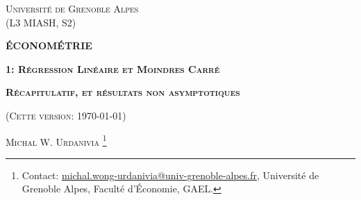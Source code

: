 \documentclass[10pt, reqno]{amsart}
\begin{document}
 
\usetikzlibrary{positioning}
\usetikzlibrary{snakes}
\usetikzlibrary{calc}
\usetikzlibrary{arrows}
\usetikzlibrary{decorations.markings}
\usetikzlibrary{shapes.misc}
\usetikzlibrary{shapes}

%

\begin{titlepage}
\centering
	{\scshape\Large \textsc{Université de Grenoble Alpes\\(L3 MIASH, S2)}\par}
	\vspace{0.5cm}
	{\Large\bfseries \scshape\Large \textsc{ÉCONOMÉTRIE}\par}
	\vspace{0.5cm}
	{\Large\bfseries \textsc{1: Régression Linéaire et Moindres Carré} \par}
    \vspace{0.5cm}   
   {\Large\bfseries \textsc{Récapitulatif, et résultats non asymptotiques} \par}
	\vspace{1cm}
	{(\textsc{Cette version: \today})\par}
	\vspace{1cm}
	{\large \textsc{Michal W. Urdanivia}
	\footnote{Contact:  
	\href{mailto:michal.wong-urdanivia@univ-grenoble-alpes.fr}{michal.wong-urdanivia@univ-grenoble-alpes.fr}, 
	 Université de Grenoble Alpes,  Faculté d'\'Economie, GAEL.}\par}
	
\end{titlepage}


\newpage

\tableofcontents

\newpage




\end{document}
